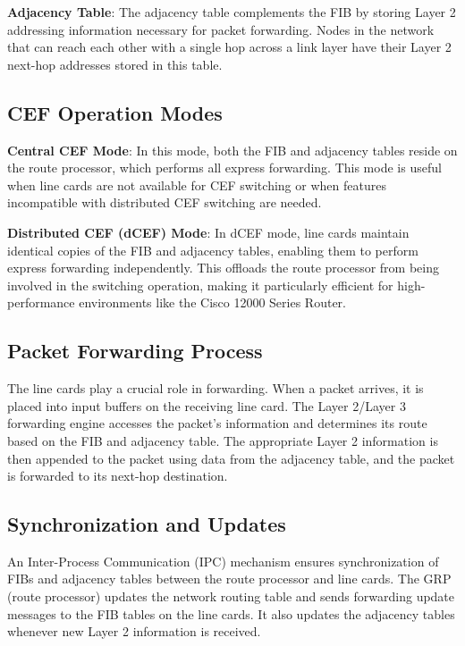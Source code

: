 \documentclass[12pt]{cwru_thesis}
\begin{document}
\textbf{Adjacency Table}: The adjacency table complements the FIB by storing Layer 2 addressing information necessary for packet forwarding. Nodes in the network that can reach each other with a single hop across a link layer have their Layer 2 next-hop addresses stored in this table.

\subsection{CEF Operation Modes}

\textbf{Central CEF Mode}: In this mode, both the FIB and adjacency tables reside on the route processor, which performs all express forwarding. This mode is useful when line cards are not available for CEF switching or when features incompatible with distributed CEF switching are needed.

\newpage

\textbf{Distributed CEF (dCEF) Mode}: In dCEF mode, line cards maintain identical copies of the FIB and adjacency tables, enabling them to perform express forwarding independently. This offloads the route processor from being involved in the switching operation, making it particularly efficient for high-performance environments like the Cisco 12000 Series Router.

\subsection{Packet Forwarding Process}

The line cards play a crucial role in forwarding. When a packet arrives, it is placed into input buffers on the receiving line card. The Layer 2/Layer 3 forwarding engine accesses the packet's information and determines its route based on the FIB and adjacency table. The appropriate Layer 2 information is then appended to the packet using data from the adjacency table, and the packet is forwarded to its next-hop destination.

\subsection{Synchronization and Updates}

An Inter-Process Communication (IPC) mechanism ensures synchronization of FIBs and adjacency tables between the route processor and line cards. The GRP (route processor) updates the network routing table and sends forwarding update messages to the FIB tables on the line cards. It also updates the adjacency tables whenever new Layer 2 information is received.
\end{document}
